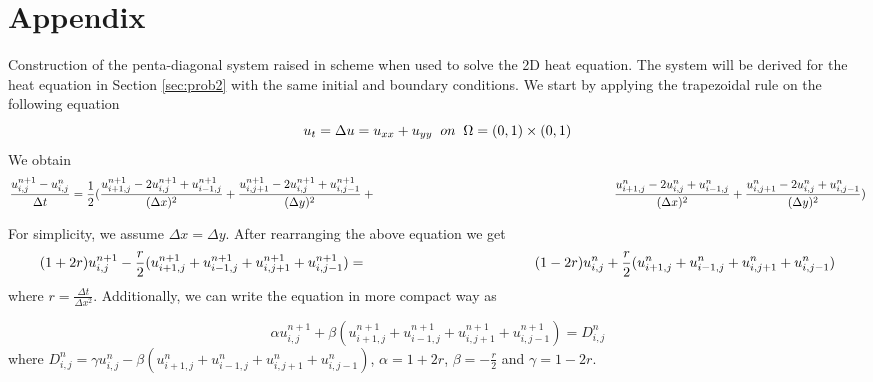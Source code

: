 \section*{Appendix}
Construction of the penta-diagonal system raised in \protect{\cn} scheme when used to solve the 2D heat equation. The system will be derived for the heat equation in Section \ref{sec:prob2} with the same initial and boundary conditions. We start by applying the trapezoidal rule on the following equation
$$
u_{t} = \Delta u = u_{xx}+u_{yy} \;\; on \;\; \Omega = (0,1) \times (0,1) \\
$$
We obtain
$$
\frac{u_{i,j}^{n+1}-u_{i,j}^{n}}{\Delta t} = \frac{1}{2}(\frac{u_{i+1,j}^{n+1} -2u_{i,j}^{n+1}+u_{i-1,j}^{n+1}}{(\Delta x)^{2}}+\frac{u_{i,j+1}^{n+1} -2u_{i,j}^{n+1}+u_{i,j-1}^{n+1}}{(\Delta y)^{2}}+\\
\qquad \qquad \qquad \qquad \qquad \qquad \qquad \qquad \qquad \qquad \frac{u_{i+1,j}^{n} -2u_{i,j}^{n}+u_{i-1,j}^{n}}{(\Delta x)^{2}}+\frac{u_{i,j+1}^{n} -2u_{i,j}^{n}+u_{i,j-1}^{n}}{(\Delta y)^{2}})
$$

For simplicity, we assume $\Delta x = \Delta y$. After rearranging the above equation we get
$$
(1+2r)u_{i,j}^{n+1} - \frac{r}{2} (u_{i+1,j}^{n+1} + u_{i-1,j}^{n+1} +u_{i,j+1}^{n+1} + u_{i,j-1}^{n+1}) = \\
\qquad \qquad \qquad \qquad \qquad \qquad (1-2r)u_{i,j}^{n} + \frac{r}{2} (u_{i+1,j}^{n} + u_{i-1,j}^{n} +u_{i,j+1}^{n} + u_{i,j-1}^{n})
$$
where $r = \frac{\Delta t}{\Delta x^{2}}$. Additionally, we can write the equation in more compact way as 

$$
\alpha u_{i,j}^{n+1} + \beta (u_{i+1,j}^{n+1} + u_{i-1,j}^{n+1} +u_{i,j+1}^{n+1} + u_{i,j-1}^{n+1}) = D_{i,j}^{n}
$$
where $D_{i,j}^{n} = \gamma u_{i,j}^{n} - \beta (u_{i+1,j}^{n} + u_{i-1,j}^{n} +u_{i,j+1}^{n} + u_{i,j-1}^{n})$, $\alpha = 1+2r$, $\beta = -\frac{r}{2}$ and $\gamma = 1-2r$. 